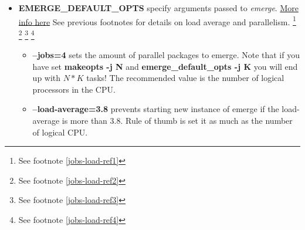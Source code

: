 \documentclass[11pt,a4paper]{article}
\begin{document}
\begin{itemize}
\begin{itemize}[label={o}]
                            \item \textbf{--jobs=4} defines how many parallel sessions to trigger, if they are possible. The recommended value is the number of logical processors in the CPU. You can obtain that number with the following command

                                \begin{lstlisting}[style=BashInputUser]
user$ nproc --all
                                \end{lstlisting}

                            \item \textbf{--load-average=3.8} option: This option prevents starting new installations if the load-average is more than $ 3.8 $. It is recommend your load-average to be as much as the number of logical CPU.

                        \end{itemize}

                    \item \textbf{EMERGE\_DEFAULT\_OPTS} specify arguments passed to \textit{emerge}. \href{https://wiki.gentoo.org/wiki/EMERGE_DEFAULT_OPTS}{More info here} See previous footnotes for details on load average and parallelism.
                    \footnote{ See footnote \ref{jobs-load-ref1}}
                    \footnote{ See footnote \ref{jobs-load-ref2}}
                    \footnote{ See footnote \ref{jobs-load-ref3}}
                    \footnote{ See footnote \ref{jobs-load-ref4}}

                        

                        \begin{itemize}[label={o}]
                            
                            \item \textbf{--jobs=4} sets the amount of parallel packages to emerge. Note that if you have set \textbf{makeopts -j N} and \textbf{emerge\_default\_opts -j K} you will end up with $ N*K $ tasks! The recommended value is the number of logical processors in the CPU.

                            \item \textbf{--load-average=3.8} prevents starting new instance of emerge if the load-average is more than $ 3.8 $. Rule of thumb is set it as much as the number of logical CPU.


\end{itemize}
\end{itemize}
\end{document}
